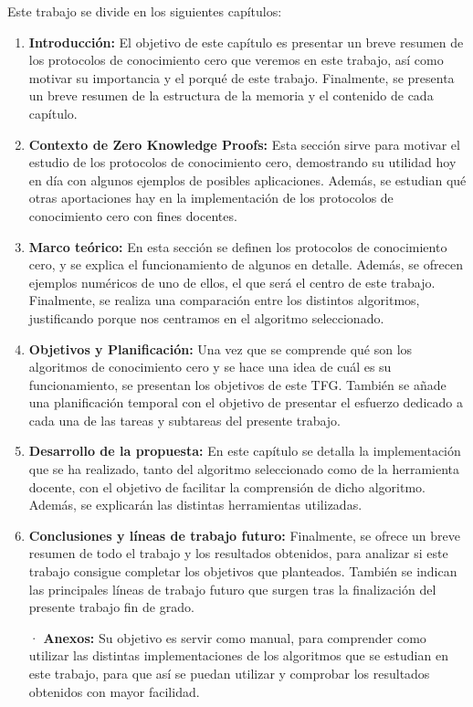 Este trabajo se divide en los siguientes capítulos:
\begin{enumerate}[label=\textbf{{\arabic*.}}]
    \item \textbf{Introducción:} El objetivo de este capítulo es presentar un breve resumen de los protocolos de conocimiento cero que veremos en este trabajo, así como motivar su importancia y el porqué de este trabajo. Finalmente, se presenta un breve resumen de la estructura de la memoria y el contenido de cada capítulo.

    \item \textbf{Contexto de Zero Knowledge Proofs:} Esta sección sirve para motivar el estudio de los protocolos de conocimiento cero, demostrando su utilidad hoy en día con algunos ejemplos de posibles aplicaciones. Además, se estudian qué otras aportaciones hay en la implementación de los protocolos de conocimiento cero con fines docentes.

    \item \textbf{Marco teórico:} En esta sección se definen los protocolos de conocimiento cero, y se explica el funcionamiento de algunos en detalle. Además, se ofrecen ejemplos numéricos de uno de ellos, el que será el centro de este trabajo. Finalmente, se realiza una comparación entre los distintos algoritmos, justificando porque nos centramos en el algoritmo seleccionado.

    \item \textbf{Objetivos y Planificación:} Una vez que se comprende qué son los algoritmos de conocimiento cero y se hace una idea de cuál es su funcionamiento, se presentan los objetivos de este TFG. También se añade una planificación temporal con el objetivo de presentar el esfuerzo dedicado a cada una de las tareas y subtareas del presente trabajo.

    \item \textbf{Desarrollo de la propuesta:} En este capítulo se detalla la implementación que se ha realizado, tanto del algoritmo seleccionado como de la herramienta docente, con el objetivo de facilitar la comprensión de dicho algoritmo. Además, se explicarán las distintas herramientas utilizadas.

    \item \textbf{Conclusiones y líneas de trabajo futuro:} Finalmente, se ofrece un breve resumen de todo el trabajo y los resultados obtenidos, para analizar si este trabajo consigue completar los objetivos que planteados. También se indican las principales líneas de trabajo futuro que surgen tras la finalización del presente trabajo fin de grado.

    \item[·] \textbf{Anexos:} Su objetivo es servir como manual, para comprender como utilizar las distintas implementaciones de los algoritmos que se estudian en este trabajo, para que así se puedan utilizar y comprobar los resultados obtenidos con mayor facilidad.
\end{enumerate}

